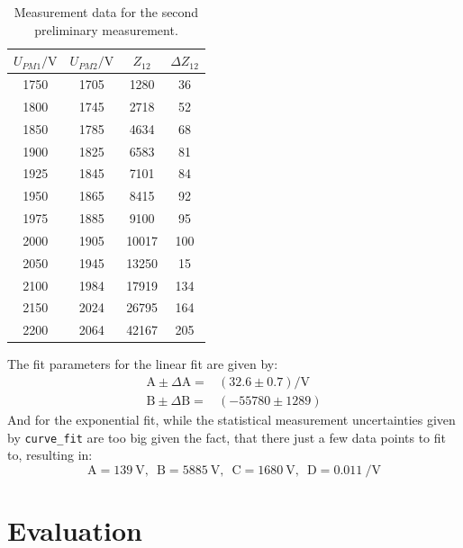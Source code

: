 \documentclass[english,  %
parskip=full,   %
headsepline]{scrartcl}
\begin{document}
\begin{table}[H]
    \caption{Measurement data for the second preliminary measurement.}
    \centering
    \begin{tabular}{c|c|c|c}
    $U_{PM1}/\si{\volt}$&$U_{PM2}/\si{\volt}$&  $Z_{12}$& $\Delta Z_{12}$\\ \hline \hline
    1750&1705&1280&36\\
    1800&1745&2718&52\\
    1850&1785&4634&68\\
    1900&1825&6583&81\\
    1925&1845& 7101&84\\
    1950&1865& 8415&92\\
    1975&1885& 9100&95\\
    2000&1905& 10017&100\\
    2050&1945& 13250&15\\
    2100&1984& 17919&134\\
    2150&2024& 26795&164\\
    2200&2064& 42167&205
    \end{tabular}
    \label{tab:vv2}
\end{table}
The fit parameters for the linear fit are given by:
\begin{align*}
\text{A} \pm \Delta \text{A}=& (32.6\pm0.7)\si{\per \volt}\\
\text{B} \pm \Delta \text{B}=& (-55780 \pm1289)
\end{align*}
And for the exponential fit, while the statistical measurement uncertainties given by \verb+curve_fit+ are too big given the fact, that there just a few data points to fit to, resulting in:
\begin{equation}
\text{A} = \SI{139}{\volt}, \,\,\, \text{B} = \SI{5885}{\volt}, \,\,\, \text{C} = \SI{1680}{\volt}, \,\,\, \text{D} = \SI{0.011}{\per\volt}
\end{equation}
\clearpage
\section{Evaluation}
\end{document}
